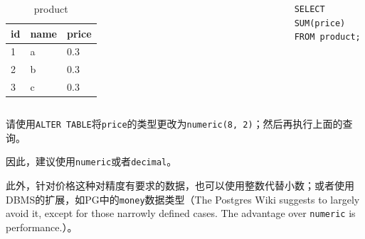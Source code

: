 \documentclass[aspectratio=169, 14pt]{beamer}
\begin{document}
\begin{frame}[fragile]

    \begin{columns}
        \begin{table}
            \caption*{product}
            \begin{tabular}{lll}
              \toprule
              id & name & price \\
              \midrule
              1 & a & 0.3 \\
              2 & b & 0.3 \\
              3 & c & 0.3 \\
              \bottomrule
            \end{tabular}
        \end{table}
        \begin{verbatim}
SELECT SUM(price) 
FROM product;
        \end{verbatim}
    \end{columns}
    
 请使用\texttt{ALTER TABLE}将\texttt{price}的类型更改为\texttt{numeric(8, 2)}；然后再执行上面的查询。
\end{frame}

\begin{frame}
因此，建议使用\texttt{numeric}或者\texttt{decimal}。


此外，针对价格这种对精度有要求的数据，也可以使用整数代替小数；或者使用DBMS的扩展，如PG中的\texttt{money}数据类型（The Postgres Wiki suggests to largely avoid it, except for those narrowly defined cases. The advantage over \texttt{numeric} is performance.）。
\end{frame}
\end{document}
